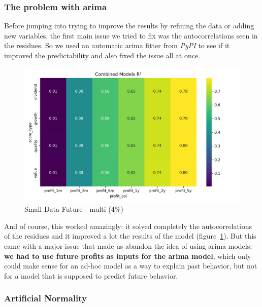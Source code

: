 \documentclass[11pt,english,a4paper,hidelinks]{book}
\begin{document}
\subsubsection{The problem with \acrshort{arima}}

\noindent Before jumping into trying to improve the results by refining the data or adding new variables, the first main issue we tried to fix was the autocorrelations seen in the residues. So we used an automatic \acrshort{arima} fitter from \textit{PyPI} \textcite{pmdarima2025} to see if it improved the predictability and also fixed the issue all at once.

\begin{figure}[H]
    \centering
    \includegraphics[width=1\textwidth]{images/code/models/linear_regression/ARIMA_performance.png}
    \caption{Small Data Future - \acrshort{multi} (4\%)}
    \label{fig:arima_linear_regression}
\end{figure}

\noindent And of course, this worked amazingly: it solved completely the autocorrelations of the residues and it improved a lot the results of the model (figure~\ref{fig:arima_linear_regression}). But this came with a major issue that made us abandon the idea of using \acrshort{arima} models; \textbf{we had to use future profits as inputs for the \acrshort{arima} model}, which only could make sense for an ad-hoc model as a way to explain past behavior, but not for a model that is supposed to predict future behavior.

\subsubsection{Artificial Normality}
\end{document}
